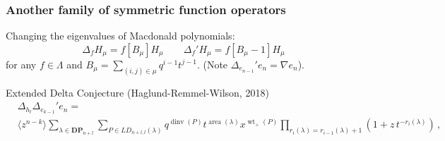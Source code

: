 \documentclass{beamer}
\newcommand{\sym}{\Lambda}
\DeclareMathOperator{\area}{area}
\DeclareMathOperator{\dinv}{dinv}
\newcommand{\DP}{\mathbf{DP}}
\newcommand{\Dyck}{\DP}
\newcommand{\LD}{LD}
\DeclareMathOperator{\wt}{wt}
\begin{document}
\begin{frame}
  \frametitle{Another family of symmetric function operators}
  Changing the eigenvalues of Macdonald polynomials:\[
    \Delta_f H_\mu = f[B_\mu]H_\mu \quad \quad \Delta_f' H_\mu = f[B_\mu-1] H_\mu
  \]
  for any \(f \in \sym\) and \(B_\mu = \sum_{(i,j) \in \mu} q^{i-1} t^{j-1}\). (Note
  \(\Delta_{e_{n-1}}' e_n = \nabla e_n\)). \pause
  \begin{block}{Extended Delta Conjecture (Haglund-Remmel-Wilson, 2018)}
    \begin{align*}
      & \Delta_{h_l} \Delta_{e_{k-1}}' e_n =
      \\ & \langle z^{n-k}\rangle
\sum_{\lambda \in \Dyck_{n+l}} \sum_{P\in\LD_{n+l,l}(\lambda)}
q^{\dinv(P)}t^{\area(\lambda)} x^{\wt_+(P)}
\prod_{r_{i}(\lambda)=r_{i-1}(\lambda)+1} \left(1+ z\,
t^{-r_i(\lambda)}\right) \,,
    \end{align*}
  \end{block}
\end{frame}
\end{document}
